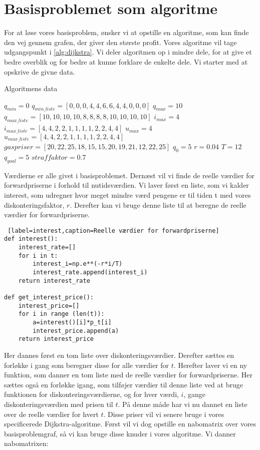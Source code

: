 \section{Basisproblemet som algoritme}
For at løse vores basisproblem, ønsker vi at opstille en algoritme, som kan finde den vej gennem grafen, der giver den største profit. Vores algoritme vil tage udgangspunkt i \autoref{alg:dijkstra}. Vi deler algoritmen op i mindre dele, for at give et bedre overblik og for bedre at kunne forklare de enkelte dele. Vi starter med at opskrive de givne data. 

\begin{algorithm}[H] 
\caption{Algoritmens data}
\begin{algorithmic}[1]
\State $q_{min}=0$
\State $q_{min\_liste}=[0,0,0,4,4,6,6,4,4,0,0,0]$
\State $q_{max}=10$
\State $q_{max\_liste}=[10,10,10,10,8,8,8,8,10,10,10,10]$
\State $i_{max}=4$
\State $i_{max\_liste}=[4,4,2,2,1,1,1,1,2,2,4,4]$
\State $u_{max}=4$
\State $u_{max\_liste}=[4,4,2,2,1,1,1,1,2,2,4,4]$
\State $gaspriser=[20,22,25,18,15,15,20,19,21,12,22,25]$
\State $q_{0}=5$
\State $r=0.04$
\State $T=12$
\State $q_{goal}=5$
\State $straffaktor=0.7$

\end{algorithmic}
\label{alg:basis}
\end{algorithm}

Værdierne er alle givet i basisproblemet.
Dernæst vil vi finde de reelle værdier for forwardpriserne i forhold til nutidsværdien. Vi laver først en liste, som vi kalder interest, som udregner hvor meget mindre værd pengene er til tiden t med vores diskonteringsfaktor, $r$. Derefter kan vi bruge denne liste til at beregne de reelle værdier for forwardpriserne.

\begin{lstlisting} [label=interest,caption=Reelle værdier for forwardpriserne]
def interest():
	interest_rate=[]
	for i in t:
		interest_i=np.e**(-r*i/T)
		interest_rate.append(interest_i)
	return interest_rate
	
def get_interest_price():
	interest_price=[]
	for i in range (len(t)):
		a=interest()[i]*p_t[i]
		interest_price.append(a)
	return interest_price

\end{lstlisting}
Her dannes først en tom liste over diskonteringsværdier. Derefter sættes en forløkke i gang som beregner disse for alle værdier for $t$. Herefter laver vi en ny funktion, som danner en tom liste med de reelle værdier for forwardpriserne. Her sættes også en forløkke igang, som tilføjer værdier til denne liste ved at bruge funktionen for diskonteringsværdierne, og for hver værdi, $i$, gange diskonteringsværdien med prisen til $t$. På denne måde har vi nu dannet en liste over de reelle værdier for hvert $t$. Disse priser vil vi senere bruge i vores specificerede Dijkstra-algoritme. Først vil vi dog opstille en nabomatrix over vores basisproblemgraf, så vi kan bruge disse knuder i vores algoritme. Vi danner nabomatrixen:

